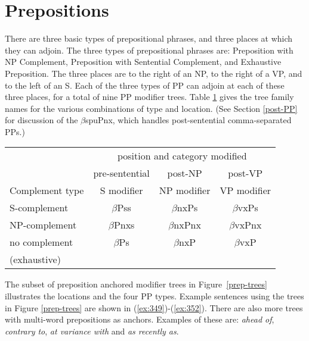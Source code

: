  
\section{Prepositions} 
\label{prep-modifier} 
 
There are three basic types of prepositional phrases, and three places 
at which they can adjoin.  The three types of prepositional phrases 
are: Preposition with NP Complement, Preposition with Sentential 
Complement, and Exhaustive Preposition.  The three places are to the 
right of an NP, to the right of a VP, and to the left of an S.  Each 
of the three types of PP can adjoin at each of these three places, for 
a total of nine PP modifier trees. Table \ref{prep-summary} gives the 
tree family names for the various combinations of type and 
location. (See Section \ref{post-PP} for discussion of the 
$\beta$spuPnx, which handles post-sentential comma-separated PPs.) 
 
\begin{table}[htb] 
\centering 
\begin{tabular}{|l||c|c|c|} 
\hline 
\multicolumn{1}{|c||}{}&\multicolumn{3}{c|}{position and category modified}\\ 
\cline{2-4} 
\multicolumn{1}{|c||}{}&pre-sentential&post-NP&post-VP\\ 
\multicolumn{1}{|c||}{Complement type}&S modifier&NP modifier&VP modifier\\ 
\hline 
\hline 
S-complement&$\beta$Pss&$\beta$nxPs&$\beta$vxPs\\ 
\hline 
NP-complement&$\beta$Pnxs&$\beta$nxPnx&$\beta$vxPnx\\ 
\hline 
no complement&$\beta$Ps&$\beta$nxP&$\beta$vxP\\ 
(exhaustive)&&&\\ 
\hline 
\end{tabular} 
\begin{rawhtml} <dl> <dt>{Preposition Anchored Modifiers <p> </dl> \end{rawhtml}
\label{prep-summary} 
\end{table} 
 
The subset of preposition anchored modifier trees in Figure~\ref{prep-trees} 
illustrates the locations and the four PP types.  Example sentences using the 
trees in Figure \ref{prep-trees} are shown in (\ref{ex:349})-(\ref{ex:352}). There are also 
more trees with multi-word prepositions as anchors. Examples of these are: 
{\it ahead of}, {\it contrary to}, {\it at variance with} and {\it as recently as}. 
 
